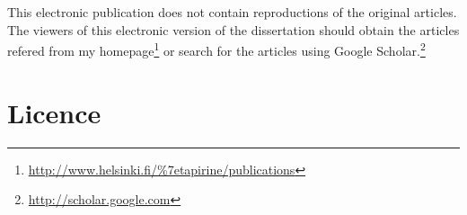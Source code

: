\documentclass[officiallayout,final]{unihelcompling}
\newif\ifprintversion
\begin{document}
\else
This electronic publication does not contain reproductions of the original
articles. The viewers of this electronic
version of the dissertation should obtain the articles refered from my
homepage\footnote{\url{http://www.helsinki.fi/\%7etapirine/publications}} or
        search for the articles using Google
        Scholar.\footnote{\url{http://scholar.google.com}}
\fi

\section{Licence}
\label{appendix:licence}
\ifprintversion



\else



\fi
\end{document}
